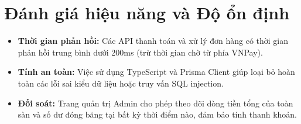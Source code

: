 \documentclass[../main.tex]{subfiles}
\begin{document}
\section{Đánh giá hiệu năng và Độ ổn định}
\begin{itemize}
    \item \textbf{Thời gian phản hồi:} Các API thanh toán và xử lý đơn hàng có thời gian phản hồi trung bình dưới 200ms (trừ thời gian chờ từ phía VNPay).
    \item \textbf{Tính an toàn:} Việc sử dụng TypeScript và Prisma Client giúp loại bỏ hoàn toàn các lỗi sai kiểu dữ liệu hoặc truy vấn SQL injection.
    \item \textbf{Đối soát:} Trang quản trị Admin cho phép theo dõi dòng tiền tổng của toàn sàn và số dư đóng băng tại bất kỳ thời điểm nào, đảm bảo tính thanh khoản.
\end{itemize}
\end{document}
